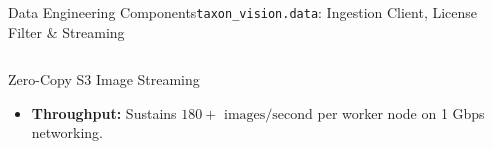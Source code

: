 \begin{frame}{Data Engineering Components}{\texttt{taxon\_vision.data}: Ingestion Client, License Filter \& Streaming}
\begin{columns}[T]
\begin{column}{0.48\textwidth}
\begin{block}{Zero-Copy S3 Image Streaming}
\begin{itemize}
                        \begin{itemize}\tiny
                            \item High-throughput concurrent worker pool streaming raw image bytes directly from AWS Open Data (\texttt{s3://inaturalist-open-data/}).
                            \item \texttt{fetch\_image\_with\_retry()}: Robust retry logic with jittered backoff.
                            \item Decodes JPEG bytes directly into memory buffers via PIL and PyTorch transforms, bypassing local disk storage entirely.
                        \end{itemize}
                    \item \textbf{Throughput:} Sustains $180+\text{ images/second}$ per worker node on 1 Gbps networking.
                \end{itemize}
            \end{block}
        \end{column}
    \end{columns}


\end{frame}

